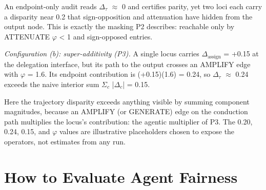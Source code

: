 \documentclass[acmsmall,nonacm]{acmart}
\begin{document}
An endpoint-only audit reads $\Delta_\tau$ $\approx$ 0 and certifies parity, yet two loci each carry a disparity near 0.2 that sign-opposition and attenuation have hidden from the output node. This is exactly the masking P2 describes: reachable only by ATTENUATE $\varphi$ < 1 and sign-opposed entries.

\emph{Configuration (b): super-additivity (P3).} A single locus carries $\Delta_{\mathrm{assign}}$ = +0.15 at the delegation interface, but its path to the output crosses an AMPLIFY edge with $\varphi$ = 1.6. Its endpoint contribution is (+0.15)(1.6) = 0.24, so $\Delta_\tau$ $\approx$ 0.24 exceeds the naive interior sum $\Sigma_c$ |$\Delta_c$| = 0.15.

\begin{table}[htbp]
\centering\small
\caption{Worked micro-example, configuration (b) (super-additivity, P3): a single locus crossing an AMPLIFY edge produces an endpoint $\Delta_\tau$ that exceeds the naive interior sum (illustrative values).}
\label{tab:example-superadd}
\end{table}

Here the trajectory disparity exceeds anything visible by summing component magnitudes, because an AMPLIFY (or GENERATE) edge on the conduction path multiplies the locus's contribution: the agentic multiplier of P3. The 0.20, 0.24, 0.15, and $\varphi$ values are illustrative placeholders chosen to expose the operators, not estimates from any run.

\section{How to Evaluate Agent Fairness}
\end{document}
